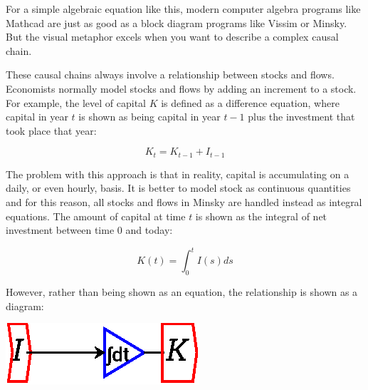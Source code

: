 \begin{center}
\end{center}

For a simple algebraic equation like this, modern computer algebra
programs like Mathcad are just as good as a block diagram programs like
Vissim or Minsky. But the visual metaphor excels when you want to describe a
complex causal chain.


These causal chains always involve a relationship between stocks and
flows. Economists normally model stocks and flows by adding an
increment to a stock. For example, the level of capital $K$ is defined as
a difference equation, where capital in year $t$ is shown as being 
capital in year $t-1$ plus the investment that took place that year:

\begin{displaymath}
K_t=K_{t-1}+I_{t-1}
\end{displaymath}

The problem with this approach is that in reality, capital is
accumulating on a daily, or even hourly, basis. It is better to model
stock as continuous quantities and for this reason, all stocks and
flows in Minsky are handled instead as integral equations. The amount
of capital at time $t$ is shown as the integral of net investment
between time 0 and today:

\begin{displaymath}
K(t)=\int_0^t I(s)ds
\end{displaymath}

However, rather than being shown as an equation, the relationship is shown as a diagram:

\begin{center}
\includegraphics{images/NewItem7.eps}
\end{center}

